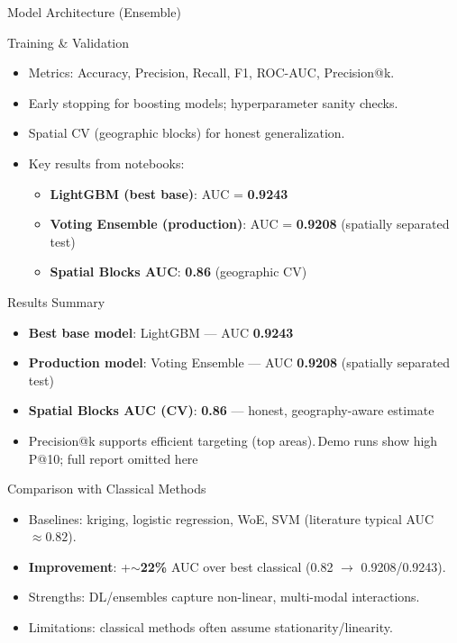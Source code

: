 \documentclass[aspectratio=169]{beamer}
\begin{document}
\begin{frame}{Model Architecture (Ensemble)}
  \centering
  \resizebox{\textwidth}{!}{}
\end{frame}

\begin{frame}{Training \& Validation}
  \begin{itemize}
    \item Metrics: Accuracy, Precision, Recall, F1, ROC-AUC, Precision@k.
    \item Early stopping for boosting models; hyperparameter sanity checks.
    \item Spatial CV (geographic blocks) for honest generalization.
    \item Key results from notebooks:
      \begin{itemize}
        \item \textbf{LightGBM (best base)}: AUC = \textbf{0.9243}
        \item \textbf{Voting Ensemble (production)}: AUC = \textbf{0.9208} (spatially separated test)
        \item \textbf{Spatial Blocks AUC}: \textbf{0.86} (geographic CV)
      \end{itemize}
  \end{itemize}
\end{frame}

\begin{frame}{Results Summary}
  \begin{itemize}
    \item \textbf{Best base model}: LightGBM — AUC \textbf{0.9243}
    \item \textbf{Production model}: Voting Ensemble — AUC \textbf{0.9208} (spatially separated test)
    \item \textbf{Spatial Blocks AUC (CV)}: \textbf{0.86} — honest, geography-aware estimate
    \item Precision@k supports efficient targeting (top areas).\footnotesize{\,Demo runs show high P@10; full report omitted here}
  \end{itemize}
\end{frame}

\begin{frame}{Comparison with Classical Methods}
  \begin{itemize}
    \item Baselines: kriging, logistic regression, WoE, SVM (literature typical AUC \(\approx 0.82\)).
    \item \textbf{Improvement}: +\(\sim\)\textbf{22\%} AUC over best classical (0.82 \(\to\) 0.9208/0.9243).
    \item Strengths: DL/ensembles capture non-linear, multi-modal interactions.
    \item Limitations: classical methods often assume stationarity/linearity.
  \end{itemize}
\end{frame}
\end{document}
